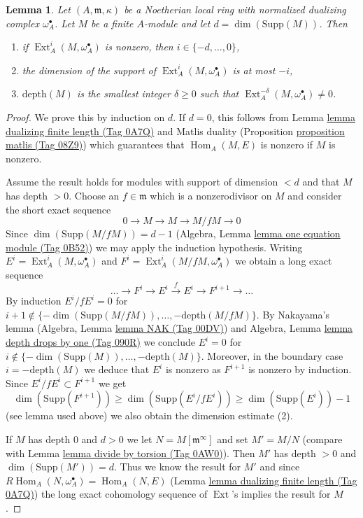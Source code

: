 \documentclass{amsart}
\theoremstyle{plain}
\newtheorem{lemma}[subsection]{Lemma}
\theoremstyle{definition}
\theoremstyle{remark}
\numberwithin{equation}{subsection}
\def\Hom{\mathop{\mathrm{Hom}}\nolimits}
\def\Ext{\mathop{\mathrm{Ext}}\nolimits}
\begin{document}
\begin{lemma}
\label{lemma-sitting-in-degrees}
Let $(A, \mathfrak m, \kappa)$ be a Noetherian local ring with
normalized dualizing complex $\omega_A^\bullet$. Let $M$ be a finite
$A$-module and let $d = \dim(\text{Supp}(M))$. Then
\begin{enumerate}
\item if $\Ext^i_A(M, \omega_A^\bullet)$ is nonzero, then
$i \in \{-d, \ldots, 0\}$,
\item the dimension of the support of $\Ext^i_A(M, \omega_A^\bullet)$
is at most $-i$,
\item $\text{depth}(M)$ is the smallest integer $\delta \geq 0$ such that
$\Ext^{-\delta}_A(M, \omega_A^\bullet) \not = 0$.
\end{enumerate}
\end{lemma}

\begin{proof}
We prove this by induction on $d$. If $d = 0$, this follows from
Lemma \href{https://stacks.math.columbia.edu/tag/0A7Q}{lemma dualizing finite length (Tag 0A7Q)} and Matlis duality
(Proposition \href{https://stacks.math.columbia.edu/tag/08Z9}{proposition matlis (Tag 08Z9)}) which guarantees that
$\Hom_A(M, E)$ is nonzero if $M$ is nonzero.

\medskip\noindent
Assume the result holds for modules with support of dimension $< d$ and that
$M$ has depth $> 0$. Choose an $f \in \mathfrak m$ which is a nonzerodivisor
on $M$ and consider the short exact sequence
$$
0 \to M \to M \to M/fM \to 0
$$
Since $\dim(\text{Supp}(M/fM)) = d - 1$
(Algebra, Lemma \href{https://stacks.math.columbia.edu/tag/0B52}{lemma one equation module (Tag 0B52)}) we
may apply the induction hypothesis.
Writing
$E^i = \Ext^i_A(M, \omega_A^\bullet)$ and
$F^i = \Ext^i_A(M/fM, \omega_A^\bullet)$
we obtain a long exact sequence
$$
\ldots \to F^i \to E^i \xrightarrow{f} E^i \to F^{i + 1} \to \ldots
$$
By induction $E^i/fE^i = 0$ for
$i + 1 \not \in \{-\dim(\text{Supp}(M/fM)), \ldots, -\text{depth}(M/fM)\}$.
By Nakayama's lemma (Algebra, Lemma \href{https://stacks.math.columbia.edu/tag/00DV}{lemma NAK (Tag 00DV)})
and Algebra, Lemma \href{https://stacks.math.columbia.edu/tag/090R}{lemma depth drops by one (Tag 090R)}
we conclude $E^i = 0$ for
$i \not \in \{-\dim(\text{Supp}(M)), \ldots, -\text{depth}(M)\}$.
Moreover, in the boundary case $i = - \text{depth}(M)$ we deduce that $E^i$
is nonzero as $F^{i + 1}$ is nonzero by induction.
Since $E^i/fE^i \subset F^{i + 1}$ we get
$$
\dim(\text{Supp}(F^{i + 1})) \geq \dim(\text{Supp}(E^i/fE^i))
\geq \dim(\text{Supp}(E^i)) - 1
$$
(see lemma used above) we also obtain the dimension estimate (2).

\medskip\noindent
If $M$ has depth $0$ and $d > 0$ we let $N = M[\mathfrak m^\infty]$ and set
$M' = M/N$ (compare with Lemma \href{https://stacks.math.columbia.edu/tag/0AW0}{lemma divide by torsion (Tag 0AW0)}).
Then $M'$ has depth $> 0$ and $\dim(\text{Supp}(M')) = d$.
Thus we know the result for $M'$ and since
$R\Hom_A(N, \omega_A^\bullet) = \Hom_A(N, E)$
(Lemma \href{https://stacks.math.columbia.edu/tag/0A7Q}{lemma dualizing finite length (Tag 0A7Q)})
the long exact cohomology sequence of $\Ext$'s implies the
result for $M$.
\end{proof}
\end{document}
